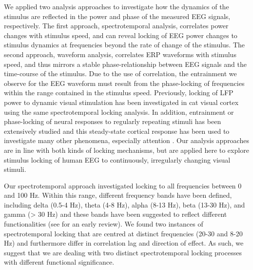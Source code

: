 We applied two analysis approaches to investigate how the dynamics of the
stimulus are reflected in the power and phase of the measured EEG signals,
respectively. The first approach, spectrotemporal analysis, correlates
power changes with stimulus speed, and can reveal locking of EEG power
changes to stimulus dynamics at frequencies beyond the rate of change of
the stimulus. The second approach, waveform analysis, correlates ERP
waveforms with stimulus speed, and thus mirrors a stable phase-relationship
between EEG signals and the time-course of the stimulus. Due to the use of
correlation, the entrainment we observe for the EEG waveform must result
from the phase-locking of frequencies within the range contained in the
stimulus speed. Previously, locking of LFP power to dynamic visual
stimulation has been investigated in cat visual cortex \citep{kayser2004b}
using the same spectrotemporal locking analysis. In addition, entrainment
or phase-locking of neural responses to regularly repeating stimuli has
been extensively studied \citep[e.g.][]{rager1998a} and this steady-state
cortical response has been used to investigate many other phenomena,
especially attention \citep[e.g.][]{muller2003a}. Our analysis approaches
are in line with both kinds of locking mechanisms, but are applied here to
explore stimulus locking of human EEG to continuously, irregularly changing
visual stimuli. 



Our spectrotemporal approach investigated locking to all frequencies
between 0 and 100 Hz. Within this range, different frequency bands have
been defined, including delta (0.5-4 Hz), theta (4-8 Hz), alpha (8-13 Hz),
beta (13-30 Hz), and gamma (> 30 Hz) and these bands have been suggested to
reflect different functionalities (see \cite{steriade1990a} for an early
review).  We found two instances of spectrotemporal locking that are
centred at distinct frequencies (20-30 and 8-20 Hz) and furthermore differ
in correlation lag and direction of effect. As such, we suggest that we are
dealing with two distinct spectrotemporal locking processes with different
functional significance.



